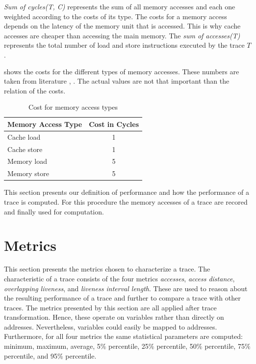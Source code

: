 \documentclass[onecolumn, openright, master, english, signatures]{dbrgrptt}
\begin{document}
\emph{Sum of cycles(T, C)} represents the sum of all memory accesses and each one weighted according to the costs of its type.
The costs for a memory access depends on the latency of the memory unit that is accessed.
This is why cache accesses are cheaper than accessing the main memory.
The \emph{sum of accesses(T)} represents the total number of load and store instructions executed by the \ac{trace} $T$.

 shows the costs for the different types of memory accesses.
These numbers are taken from literature \cite{drepper2007every}, \cite{skylake}.
The actual values are not that important than the relation of the costs.

\begin{table}[!ht]
  \centering
  \begin{tabular}{lc}
  \hline
  Memory Access Type & Cost in Cycles \\
  \hline
  Cache  load  & 1 \\
  Cache  store & 1 \\
  Memory load  & 5 \\
  Memory store & 5 \\
  \hline
  \end{tabular}
  \caption{Cost for memory access types}
  \label{tab:memory-access-cost}
\end{table}

This section presents our definition of performance and how the performance of a trace is computed.
For this procedure the memory accesses of a \ac{trace} are recored and finally used for computation.


\section{Metrics}\label{sec:metrics}

This section presents the metrics chosen to characterize a \ac{trace}.
The characteristic of a \ac{trace} consists of the four metrics \emph{accesses}, \emph{access distance}, \emph{overlapping liveness}, and \emph{liveness interval length}.
These are used to reason about the resulting performance of a \ac{trace} and further to compare a \ac{trace} with other \ac{trace}s.
The metrics presented by this section are all applied after \ac{trace} transformation.
Hence, these operate on variables rather than directly on addresses.
Nevertheless, variables could easily be mapped to addresses.
Furthermore, for all four metrics the same statistical parameters are computed: minimum, maximum, average, 5\% percentile, 25\% percentile, 50\% percentile, 75\% percentile, and 95\% percentile.
\end{document}
